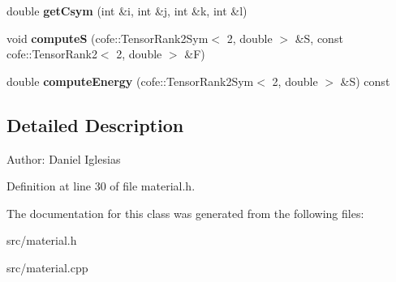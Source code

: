 \begin{CompactItemize}
\item 
\hypertarget{classmknix_1_1Material_457fa23b27193eb7b05f28cce48815c9}{
double \textbf{getCsym} (int \&i, int \&j, int \&k, int \&l)}
\label{classmknix_1_1Material_457fa23b27193eb7b05f28cce48815c9}

\item 
\hypertarget{classmknix_1_1Material_4659947ce09c0f9c02b61d8f7d37dec8}{
void \textbf{computeS} (cofe::TensorRank2Sym$<$ 2, double $>$ \&S, const cofe::TensorRank2$<$ 2, double $>$ \&F)}
\label{classmknix_1_1Material_4659947ce09c0f9c02b61d8f7d37dec8}

\item 
\hypertarget{classmknix_1_1Material_0bac41d11dc617966a8db2fc75df63f7}{
double \textbf{computeEnergy} (cofe::TensorRank2Sym$<$ 2, double $>$ \&S) const }
\label{classmknix_1_1Material_0bac41d11dc617966a8db2fc75df63f7}

\end{CompactItemize}


\subsection{Detailed Description}
\begin{Desc}
\item[Author:]Daniel Iglesias \end{Desc}


Definition at line 30 of file material.h.

The documentation for this class was generated from the following files:\begin{CompactItemize}
\item 
src/material.h\item 
src/material.cpp\end{CompactItemize}
